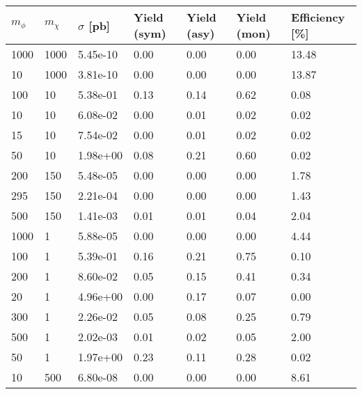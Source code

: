 \begin{table}
\small
\centering
\begin{tabular}{lllllll}
\hline
$m_\phi$ & $m_\chi$ & $\sigma$ [pb] & Yield (sym) & Yield (asy) & Yield (mon) & Efficiency [\%] \\ \hline
1000      &   1000      &   5.45e-10  &   0.00      &   0.00      &   0.00      &   13.48     \\ 
10        &   1000      &   3.81e-10  &   0.00      &   0.00      &   0.00      &   13.87     \\ 
100       &   10        &   5.38e-01  &   0.13      &   0.14      &   0.62      &   0.08      \\ 
10        &   10        &   6.08e-02  &   0.00      &   0.01      &   0.02      &   0.02      \\ 
15        &   10        &   7.54e-02  &   0.00      &   0.01      &   0.02      &   0.02      \\ 
50        &   10        &   1.98e+00  &   0.08      &   0.21      &   0.60      &   0.02      \\ 
200       &   150       &   5.48e-05  &   0.00      &   0.00      &   0.00      &   1.78      \\ 
295       &   150       &   2.21e-04  &   0.00      &   0.00      &   0.00      &   1.43      \\ 
500       &   150       &   1.41e-03  &   0.01      &   0.01      &   0.04      &   2.04      \\ 
1000      &   1         &   5.88e-05  &   0.00      &   0.00      &   0.00      &   4.44      \\ 
100       &   1         &   5.39e-01  &   0.16      &   0.21      &   0.75      &   0.10      \\ 
200       &   1         &   8.60e-02  &   0.05      &   0.15      &   0.41      &   0.34      \\ 
20        &   1         &   4.96e+00  &   0.00      &   0.17      &   0.07      &   0.00      \\ 
300       &   1         &   2.26e-02  &   0.05      &   0.08      &   0.25      &   0.79      \\ 
500       &   1         &   2.02e-03  &   0.01      &   0.02      &   0.05      &   2.00      \\ 
50        &   1         &   1.97e+00  &   0.23      &   0.11      &   0.28      &   0.02      \\ 
10        &   500       &   6.80e-08  &   0.00      &   0.00      &   0.00      &   8.61      \\ 

\end{tabular}
\end{table}
